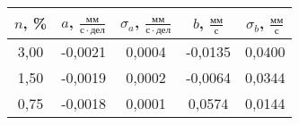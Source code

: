 \begin{tabular}[t]{|c|c|c|c|c|}
\hline
$n$, \% & $a$, $\frac{мм}{с \cdot дел}$ & $\sigma_a$, $\frac{мм}{с \cdot дел}$ & $b$, $\frac{мм}{с}$ & $\sigma_b$, $\frac{мм}{с}$ \\ 
\hline
3,00 & -0,0021 & 0,0004 & -0,0135 & 0,0400 \\ 
1,50 & -0,0019 & 0,0002 & -0,0064 & 0,0344 \\ 
0,75 & -0,0018 & 0,0001 & 0,0574 & 0,0144 \\ 
\hline
\end{tabular}